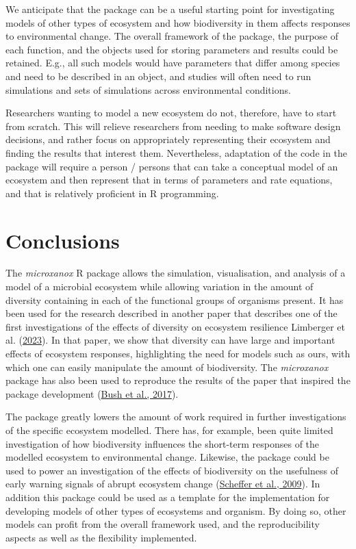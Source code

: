 \documentclass[
]{article}
\begin{document}
We anticipate that the package can be a useful starting point for investigating models of other types of ecosystem and how biodiversity in them affects responses to environmental change. The overall framework of the package, the purpose of each function, and the objects used for storing parameters and results could be retained. E.g., all such models would have parameters that differ among species and need to be described in an object, and studies will often need to run simulations and sets of simulations across environmental conditions.

Researchers wanting to model a new ecosystem do not, therefore, have to start from scratch. This will relieve researchers from needing to make software design decisions, and rather focus on appropriately representing their ecosystem and finding the results that interest them. Nevertheless, adaptation of the code in the package will require a person / persons that can take a conceptual model of an ecosystem and then represent that in terms of parameters and rate equations, and that is relatively proficient in R programming.

\hypertarget{conclusions}{%
\section{Conclusions}\label{conclusions}}

The \emph{microxanox} R package allows the simulation, visualisation, and analysis of a model of a microbial ecosystem while allowing variation in the amount of diversity containing in each of the functional groups of organisms present. It has been used for the research described in another paper that describes one of the first investigations of the effects of diversity on ecosystem resilience Limberger et al. (\protect\hyperlink{ref-Limberger2022}{2023}). In that paper, we show that diversity can have large and important effects of ecosystem responses, highlighting the need for models such as ours, with which one can easily manipulate the amount of biodiversity. The \emph{microxanox} package has also been used to reproduce the results of the paper that inspired the package development (\protect\hyperlink{ref-Bush2017}{Bush et al., 2017}).

The package greatly lowers the amount of work required in further investigations of the specific ecosystem modelled. There has, for example, been quite limited investigation of how biodiversity influences the short-term responses of the modelled ecosystem to environmental change. Likewise, the package could be used to power an investigation of the effects of biodiversity on the usefulness of early warning signals of abrupt ecosystem change (\protect\hyperlink{ref-Scheffer2009}{Scheffer et al., 2009}). In addition this package could be used as a template for the implementation for developing models of other types of ecosystems and organism. By doing so, other models can profit from the overall framework used, and the reproducibility aspects as well as the flexibility implemented.
\end{document}
